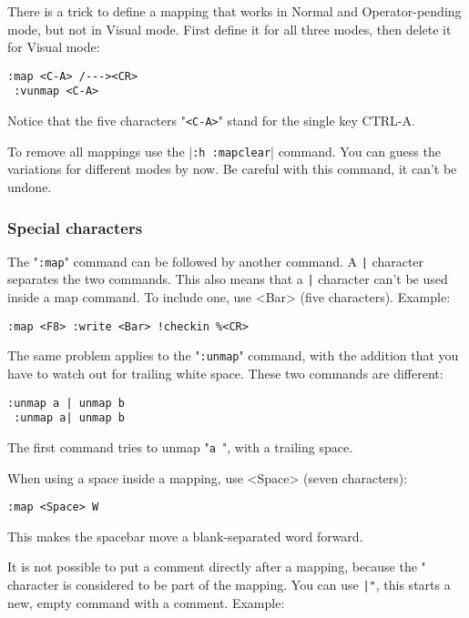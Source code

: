There is a trick to define a mapping that works in Normal and Operator-pending mode, but not in Visual mode.
First define it for all three modes, then delete it for Visual mode:

\begin{Verbatim}[samepage=true]
 :map <C-A> /---><CR>
 :vunmap <C-A>
\end{Verbatim}

Notice that the five characters "\texttt{<C-A>}" stand for the single key CTRL-A.

To remove all mappings use the |\texttt{:h :mapclear}| command.
You can guess the variations for different modes by now.
Be careful with this command, it can't be undone.

\subsubsection{Special characters}
The "\texttt{:map}" command can be followed by another command.
A \texttt{|} character separates the two commands.
This also means that a \texttt{|} character can't be used inside a map command.
To include one, use <Bar> (five characters).
Example:

\begin{Verbatim}[samepage=true]
 :map <F8> :write <Bar> !checkin %<CR>
\end{Verbatim}

The same problem applies to the "\texttt{:unmap}" command, with the addition that you have to watch out for trailing white space.
These two commands are different:

\begin{Verbatim}[samepage=true]
 :unmap a | unmap b
 :unmap a| unmap b
\end{Verbatim}

The first command tries to unmap "\texttt{a }", with a trailing space.

When using a space inside a mapping, use <Space> (seven characters):

\begin{Verbatim}[samepage=true]
 :map <Space> W
\end{Verbatim}

This makes the spacebar move a blank-separated word forward.

It is not possible to put a comment directly after a mapping, because the " character is considered to be part of the mapping.
You can use \texttt{|"}, this starts a new, empty command with a comment.
Example:

